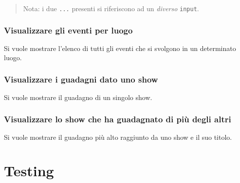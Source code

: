 \documentclass[a4paper,11pt]{article}
\begin{document}
\begin{quote}
  Nota: i due \texttt{...} presenti si riferiscono ad un \emph{diverso} \texttt{input}.
\end{quote}

\subsubsection{Visualizzare gli eventi per luogo}
Si vuole mostrare l'elenco di tutti gli eventi che si svolgono in un determinato luogo.


\subsubsection{Visualizzare i guadagni dato uno show}
Si vuole mostrare il guadagno di un singolo show.


\subsubsection{Visualizzare lo show che ha guadagnato di più degli altri}
Si vuole mostrare il guadagno pi\`u alto raggiunto da uno show e il suo titolo.


\section{Testing}
\end{document}
